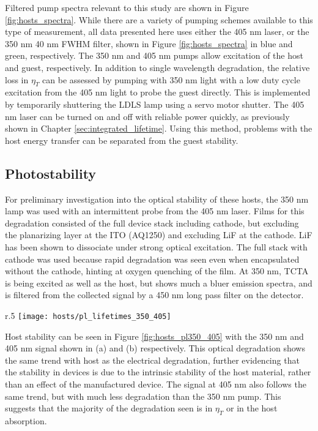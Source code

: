 \documentclass[../thesis.tex]{subfiles}
\begin{document}
Filtered pump spectra relevant to this study are shown in Figure \ref{fig:hosts_spectra}.
While there are a variety of pumping schemes available to this type of measurement, all data presented here uses either the 405 nm laser, or the 350 nm 40 nm FWHM filter, shown in Figure \ref{fig:hosts_spectra} in blue and green, respectively.
The 350 nm and 405 nm pumps allow excitation of the host and guest, respectively.
In addition to single wavelength degradation, the relative loss in $\eta_T$ can be assessed by pumping with 350 nm light with a low duty cycle excitation from the 405 nm light to probe the guest directly.
This is implemented by temporarily shuttering the LDLS lamp using a servo motor shutter.
The 405 nm laser can be turned on and off with reliable power quickly, as previously shown in Chapter \ref{sec:integrated_lifetime}.
Using this method, problems with the host energy transfer can be separated from the guest stability.


\subsection{Photostability}\label{sec:hosts_stability}


For preliminary investigation into the optical stability of these hosts, the 350 nm lamp was used with an intermittent probe from the 405 nm laser.
Films for this degradation consisted of the full device stack including cathode, but excluding the planarizing layer at the ITO (AQ1250) and excluding LiF at the cathode.
LiF has been shown to dissociate under strong optical excitation.\supercite{Wang2011a}
The full stack with cathode was used because rapid degradation was seen even when encapsulated without the cathode, hinting at oxygen quenching of the film.
At 350 nm, TCTA is being excited as well as the host, but shows much a bluer emission spectra, and is filtered from the collected signal by a 450 nm long pass filter on the detector.

\begin{wrapfigure}{r}{.5\textwidth}
\centering
\texttt{[image: hosts/pl\_lifetimes\_350\_405]}
\caption{Photodegradation at 350 nm, with intermittent (10 s every 10 min) probe at 405 nm for all hosts.}
\label{fig:hosts_pl350_405}
\end{wrapfigure}

Host stability can be seen in Figure \ref{fig:hosts_pl350_405} with the 350 nm and 405 nm signal shown in (a) and (b) respectively.
This optical degradation shows the same trend with host as the electrical degradation, further evidencing that the stability in devices is due to the intrinsic stability of the host material, rather than an effect of the manufactured device.
The signal at 405 nm also follows the same trend, but with much less degradation than the 350 nm pump.
This suggests that the majority of the degradation seen is in $\eta_T$ or in the host absorption.
\end{document}
